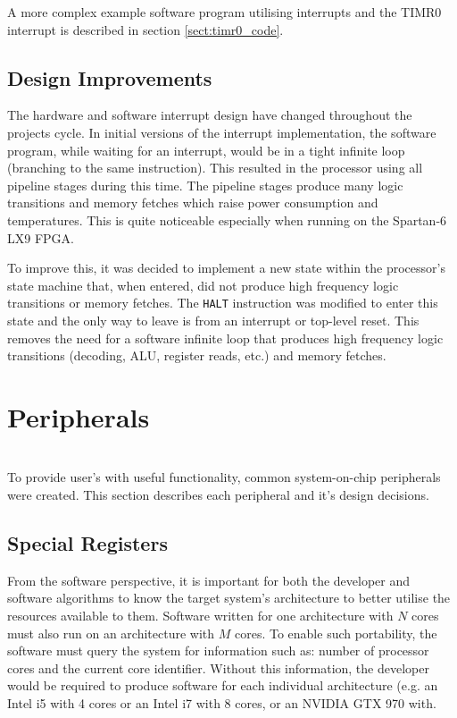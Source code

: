 A more complex example software program utilising interrupts and the TIMR0 interrupt is described in section \ref{sect:timr0_code}.

\section{Design Improvements}
The hardware and software interrupt design have changed throughout the projects cycle. In initial versions of the interrupt implementation, the software program, while waiting for an interrupt, would be in a tight infinite loop (branching to the same instruction). This resulted in the processor using all pipeline stages during this time. The pipeline stages produce many logic transitions and memory fetches which raise power consumption and temperatures. This is quite noticeable especially when running on the Spartan-6 LX9 FPGA.

To improve this, it was decided to implement a new state within the processor's state machine that, when entered, did not produce high frequency logic transitions or memory fetches. The \verb|HALT| instruction was modified to enter this state and the only way to leave is from an interrupt or top-level reset. This removes the need for a software infinite loop that produces high frequency logic transitions (decoding, ALU, register reads, etc.) and memory fetches.

\newpage
\chapter{Peripherals}
{%
\startcontents[chapters]
}
\noindent\\
To provide user's with useful functionality, common system-on-chip peripherals were created. This section describes each peripheral and it's design decisions.

\section{Special Registers}
From the software perspective, it is important for both the developer and software algorithms to know the target system's architecture to better utilise
the resources available to them.
Software written for one architecture with $N$ cores must also run on an architecture with $M$ cores. To enable such portability, the software must query the system for information such as: number of processor cores and the current core identifier. Without this information, the developer would be required to produce software for each individual architecture (e.g. an Intel i5 with 4 cores or an Intel i7 with 8 cores, or an NVIDIA GTX 970 with.


